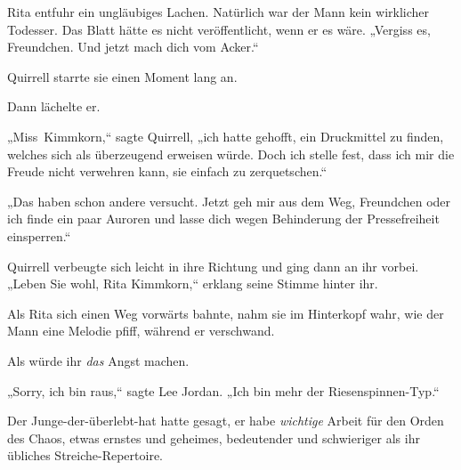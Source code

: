 Rita entfuhr ein ungläubiges Lachen. Natürlich war der Mann kein wirklicher Todesser. Das Blatt hätte es nicht veröffentlicht, wenn er es wäre. „Vergiss es, Freundchen. Und jetzt mach dich vom Acker.“

Quirrell starrte sie einen Moment lang an.

Dann lächelte er.

„Miss~Kimmkorn,“ sagte Quirrell, „ich hatte gehofft, ein Druckmittel zu finden, welches sich als überzeugend erweisen würde. Doch ich stelle fest, dass ich mir die Freude nicht verwehren kann, sie einfach zu zerquetschen.“

„Das haben schon andere versucht. Jetzt geh mir aus dem Weg, Freundchen oder ich finde ein paar Auroren und lasse dich wegen Behinderung der Pressefreiheit einsperren.“

Quirrell verbeugte sich leicht in ihre Richtung und ging dann an ihr vorbei. „Leben Sie wohl, Rita Kimmkorn,“ erklang seine Stimme hinter ihr.

Als Rita sich einen Weg vorwärts bahnte, nahm sie im Hinterkopf wahr, wie der Mann eine Melodie pfiff, während er verschwand.

Als würde ihr \emph{das} Angst machen.


„Sorry, ich bin raus,“ sagte Lee Jordan. „Ich bin mehr der Riesenspinnen-Typ.“

Der Junge-der-überlebt-hat hatte gesagt, er habe \emph{wichtige} Arbeit für den Orden des Chaos, etwas ernstes und geheimes, bedeutender und schwieriger als ihr übliches Streiche-Repertoire.

